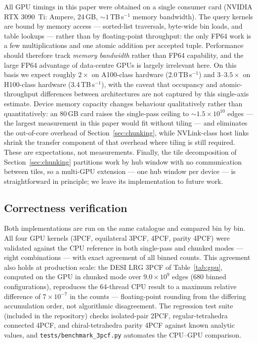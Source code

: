 \documentclass[twocolumn]{aastex701}
\begin{document}
All GPU timings in this paper were obtained on a single consumer card
(NVIDIA RTX 3090~Ti: Ampere, 24\,GB, ${\sim}1$\,TB\,s$^{-1}$ memory
bandwidth).  The query kernels are bound by memory access --- sorted-list
traversals, byte-wide bin loads, and table lookups --- rather than by
floating-point throughput: the only FP64 work is a few multiplications and
one atomic addition per accepted tuple.  Performance should therefore
track \emph{memory bandwidth} rather than FP64 capability, and the large
FP64 advantage of data-centre GPUs is largely irrelevant here.  On this
basis we expect roughly $2\times$ on A100-class hardware
(2.0\,TB\,s$^{-1}$) and $3$--$3.5\times$ on H100-class hardware
(3.4\,TB\,s$^{-1}$), with the caveat that occupancy and atomic-throughput
differences between architectures are not captured by this single-axis
estimate.  Device memory capacity changes behaviour qualitatively rather
than quantitatively: an 80\,GB card raises the single-pass ceiling to
${\sim}1.5\times10^{10}$ edges --- the largest measurement in this paper
would fit without tiling --- and eliminates the out-of-core overhead of
Section~\ref{sec:chunking}, while NVLink-class host links shrink the
transfer component of that overhead where tiling is still required.  These
are expectations, not measurements.  Finally, the tile decomposition of
Section~\ref{sec:chunking} partitions work by hub window with no
communication between tiles, so a multi-GPU extension --- one hub window
per device --- is straightforward in principle; we leave its
implementation to future work.

\subsection{Correctness verification}
\label{sec:correctness}

Both implementations are run on the same catalogue and compared bin by
bin.  All four GPU kernels (3PCF, equilateral 3PCF, 4PCF, parity 4PCF)
were validated against the CPU reference in both single-pass and chunked
modes --- eight combinations --- with exact agreement of all binned counts.
This agreement also holds at production scale: the DESI LRG 3PCF of
Table~\ref{tab:gpu}, computed on the GPU in chunked mode over
$9.0\times10^9$ edges (680 binned configurations), reproduces the
64-thread CPU result to a maximum relative difference of $7\times10^{-7}$
in the counts --- floating-point rounding from the differing accumulation
order, not algorithmic disagreement.
The regression test suite (included in the repository) checks
isolated-pair 2PCF, regular-tetrahedra connected 4PCF, and
chiral-tetrahedra parity 4PCF against known analytic values, and
\texttt{tests/benchmark\_3pcf.py} automates the CPU--GPU comparison.
\end{document}
